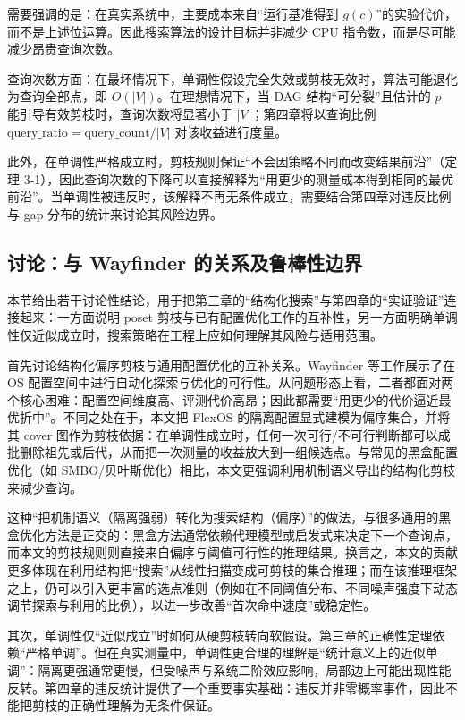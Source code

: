 \documentclass[UTF8,a4paper,12pt,twoside]{ctexart}  %
\begin{document}
需要强调的是：在真实系统中，主要成本来自``运行基准得到
\(g(c)\)''的实验代价，而不是上述位运算。因此搜索算法的设计目标并非减少
CPU 指令数，而是尽可能减少昂贵查询次数。

查询次数方面：在最坏情况下，单调性假设完全失效或剪枝无效时，算法可能退化为查询全部点，即
\(O(|V|)\)。在理想情况下，当 DAG 结构``可分裂''且估计的 \(p\)
能引导有效剪枝时，查询次数将显著小于 \(|V|\)；第四章将以查询比例
\(\text{query\_ratio}=\text{query\_count}/|V|\) 对该收益进行度量。

此外，在单调性严格成立时，剪枝规则保证``不会因策略不同而改变结果前沿''（定理
3-1），因此查询次数的下降可以直接解释为``用更少的测量成本得到相同的最优前沿''。当单调性被违反时，该解释不再无条件成立，需要结合第四章对违反比例与
gap 分布的统计来讨论其风险边界。

\subsection{讨论：与 Wayfinder
  的关系及鲁棒性边界}

本节给出若干讨论性结论，用于把第三章的``结构化搜索''与第四章的``实证验证''连接起来：一方面说明
poset
剪枝与已有配置优化工作的互补性，另一方面明确单调性仅近似成立时，搜索策略在工程上应如何理解其风险与适用范围。

首先讨论结构化偏序剪枝与通用配置优化的互补关系。Wayfinder 等工作展示了在 OS
配置空间中进行自动化探索与优化的可行性\cite{3}。从问题形态上看，二者都面对两个核心困难：配置空间维度高、评测代价高昂；因此都需要``用更少的代价逼近最优折中''。不同之处在于，本文把
FlexOS 的隔离配置显式建模为偏序集合，并将其 cover
图作为剪枝依据：在单调性成立时，任何一次可行/不可行判断都可以成批删除祖先或后代，从而把一次测量的收益放大到一组候选点。与常见的黑盒配置优化（如
SMBO/贝叶斯优化）相比\cite{24,25}，本文更强调利用机制语义导出的结构化剪枝来减少查询。

这种``把机制语义（隔离强弱）转化为搜索结构（偏序）''的做法，与很多通用的黑盒优化方法是正交的：黑盒方法通常依赖代理模型或启发式来决定下一个查询点，而本文的剪枝规则则直接来自偏序与阈值可行性的推理结果。换言之，本文的贡献更多体现在利用结构把``搜索''从线性扫描变成可剪枝的集合推理；而在该推理框架之上，仍可以引入更丰富的选点准则（例如在不同阈值分布、不同噪声强度下动态调节探索与利用的比例），以进一步改善``首次命中速度''或稳定性。

其次，单调性仅``近似成立''时如何从硬剪枝转向软假设。第三章的正确性定理依赖``严格单调''。但在真实测量中，单调性更合理的理解是``统计意义上的近似单调''：隔离更强通常更慢，但受噪声与系统二阶效应影响，局部边上可能出现性能反转。第四章的违反统计提供了一个重要事实基础：违反并非零概率事件，因此不能把剪枝的正确性理解为无条件保证。
\end{document}
